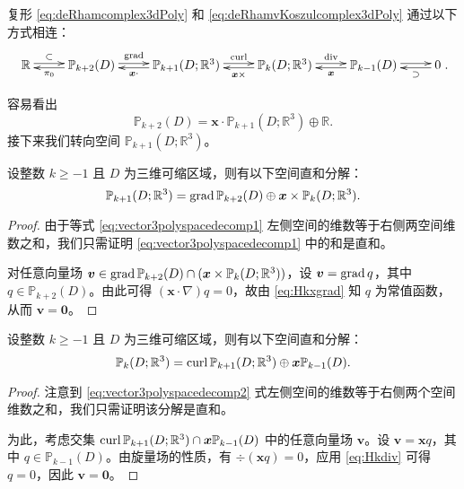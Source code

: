 复形 \eqref{eq:deRhamcomplex3dPoly} 和 \eqref{eq:deRhamvKoszulcomplex3dPoly} 通过以下方式相连：
\begin{equation}\label{eq:divdivcomplex3dPolydouble}
\xymatrix{
\mathbb R\ar@<0.4ex>[r]^-{\subset} & \mathbb P_{k+2}(D)\ar@<0.4ex>[r]^-{\grad}\ar@<0.4ex>[l]^-{\pi_{0}} & \mathbb P_{k+1}(D; \mathbb R^3)\ar@<0.4ex>[r]^-{\curl}\ar@<0.4ex>[l]^-{\boldsymbol x\cdot}  & \mathbb P_k(D; \mathbb R^3) \ar@<0.4ex>[r]^-{\div}\ar@<0.4ex>[l]^-{\boldsymbol x\times} & \mathbb P_{k-1}(D)  \ar@<0.4ex>[r]^-{} \ar@<0.4ex>[l]^-{\boldsymbol x}
& 0 \ar@<0.4ex>[l]^-{\supset} }.
\end{equation}

容易看出
\[
\mathbb P_{k+2}(D)= \boldsymbol x\cdot\mathbb P_{k+1}(D; \mathbb R^3)\oplus\mathbb R.
\]
接下来我们转向空间 $\mathbb P_{k+1}(D; \mathbb R^3)$。
\begin{lemma}
设整数 $k \geq -1$ 且 $D$ 为三维可缩区域，则有以下空间直和分解：
\begin{equation}\label{eq:vector3polyspacedecomp1}
\mathbb P_{k+1}(D; \mathbb R^3)=\operatorname{grad}\mathbb P_{k+2}(D)\oplus\boldsymbol x\times\mathbb P_k(D; \mathbb R^3).
\end{equation}
\end{lemma}
\begin{proof}
由于等式 \eqref{eq:vector3polyspacedecomp1} 左侧空间的维数等于右侧两空间维数之和，我们只需证明 \eqref{eq:vector3polyspacedecomp1} 中的和是直和。

对任意向量场 $\boldsymbol v \in \operatorname{grad}\mathbb P_{k+2}(D) \cap (\boldsymbol x\times\mathbb P_k(D; \mathbb R^3))$，设 $\boldsymbol v = \operatorname{grad} q$，其中 $q \in \mathbb P_{k+2}(D)$。由此可得 $(\boldsymbol x\cdot\nabla)q = 0$，故由 \eqref{eq:Hkxgrad} 知 $q$ 为常值函数，从而 $\boldsymbol v = \boldsymbol 0$。
\end{proof}

\begin{lemma}
设整数 $k \geq -1$ 且 $D$ 为三维可缩区域，则有以下空间直和分解：
\begin{equation}\label{eq:vector3polyspacedecomp2}
\mathbb P_{k}(D; \mathbb R^3)=\operatorname{curl}\mathbb P_{k+1}(D;\mathbb R^3)\oplus \boldsymbol x\mathbb P_{k-1}(D).
\end{equation}
\end{lemma}
\begin{proof}
注意到 \eqref{eq:vector3polyspacedecomp2} 式左侧空间的维数等于右侧两个空间维数之和，我们只需证明该分解是直和。

为此，考虑交集 $\operatorname{curl}\mathbb P_{k+1}(D;\mathbb R^3) \cap \boldsymbol x\mathbb P_{k-1}(D)$ 中的任意向量场 $\boldsymbol v$。设 $\boldsymbol v = \boldsymbol x q$，其中 $q \in \mathbb P_{k-1}(D)$。由旋量场的性质，有 $\div(\boldsymbol x q) = 0$，应用 \eqref{eq:Hkdiv} 可得 $q = 0$，因此 $\boldsymbol v = \boldsymbol 0$。
\end{proof}


